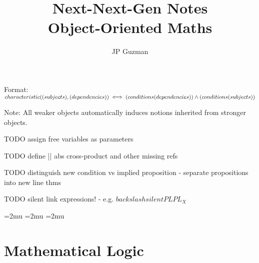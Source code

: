 \documentclass[a4paper]{article}
\title{Next-Next-Gen Notes \\
\large Object-Oriented Maths}
\author{JP Guzman}
\def\ml{\mleft}
\def\mr{\mright}
\begin{document}
\maketitle
\allowdisplaybreaks

Format: $characteristic\ml(\ml(subjects\mr), \ml(dependencies\mr)\mr) \iff \ml(conditions\ml(dependencies\mr)\mr) \land \ml(conditions\ml(subjects\mr)\mr)$

Note: All weaker objects automatically induces notions inherited from stronger objects.

TODO assign free variables as parameters

TODO define || abs  cross-product and other missing refs

TODO distinguish new condition vs implied proposition
- separate propositions into new line thms

TODO silent link expressions!
- e.g. $backslash silentPL{PL_X}$

\thinmuskip=2mu %
\medmuskip=2mu %
\thickmuskip=2mu %
\setlength{\belowdisplayskip}{0pt} \setlength{\belowdisplayshortskip}{0pt}
\setlength{\abovedisplayskip}{0pt} \setlength{\abovedisplayshortskip}{0pt}


\section{Mathematical Logic}
\end{document}
